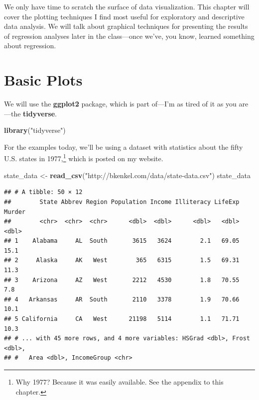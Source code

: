 \documentclass[12pt,oneside,openany]{book}
\newenvironment{Shaded}{\begin{snugshade}}{\end{snugshade}}
\newcommand{\KeywordTok}[1]{\textcolor[rgb]{0.13,0.29,0.53}{\textbf{{#1}}}}
\newcommand{\StringTok}[1]{\textcolor[rgb]{0.31,0.60,0.02}{{#1}}}
\newcommand{\NormalTok}[1]{{#1}}
\let\rmarkdownfootnote\footnote%
\def\footnote{\protect\rmarkdownfootnote}
\begin{document}
We only have time to scratch the surface of data visualization. This
chapter will cover the plotting techniques I find most useful for
exploratory and descriptive data analysis. We will talk about graphical
techniques for presenting the results of regression analyses later in
the class---once we've, you know, learned something about regression.

\section{Basic Plots}\label{basic-plots}

We will use the \textbf{ggplot2} package, which is part of---I'm as
tired of it as you are---the \textbf{tidyverse}.

\begin{Shaded}
\begin{Highlighting}[]
\KeywordTok{library}\NormalTok{(}\StringTok{"tidyverse"}\NormalTok{)}
\end{Highlighting}
\end{Shaded}

For the examples today, we'll be using a dataset with statistics about
the fifty U.S. states in 1977,\footnote{Why 1977? Because it was easily
  available. See the appendix to this chapter.} which is posted on my
website.

\begin{Shaded}
\begin{Highlighting}[]
\NormalTok{state_data <-}\StringTok{ }\KeywordTok{read_csv}\NormalTok{(}\StringTok{"http://bkenkel.com/data/state-data.csv"}\NormalTok{)}
\NormalTok{state_data}
\end{Highlighting}
\end{Shaded}

\begin{verbatim}
## # A tibble: 50 × 12
##        State Abbrev Region Population Income Illiteracy LifeExp Murder
##        <chr>  <chr>  <chr>      <dbl>  <dbl>      <dbl>   <dbl>  <dbl>
## 1    Alabama     AL  South       3615   3624        2.1   69.05   15.1
## 2     Alaska     AK   West        365   6315        1.5   69.31   11.3
## 3    Arizona     AZ   West       2212   4530        1.8   70.55    7.8
## 4   Arkansas     AR  South       2110   3378        1.9   70.66   10.1
## 5 California     CA   West      21198   5114        1.1   71.71   10.3
## # ... with 45 more rows, and 4 more variables: HSGrad <dbl>, Frost <dbl>,
## #   Area <dbl>, IncomeGroup <chr>
\end{verbatim}
\end{document}
